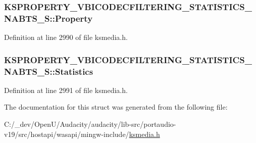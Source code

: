 \subsubsection[{\texorpdfstring{Property}{Property}}]{ K\+S\+P\+R\+O\+P\+E\+R\+T\+Y\+\_\+\+V\+B\+I\+C\+O\+D\+E\+C\+F\+I\+L\+T\+E\+R\+I\+N\+G\+\_\+\+S\+T\+A\+T\+I\+S\+T\+I\+C\+S\+\_\+\+N\+A\+B\+T\+S\+\_\+\+S\+::\+Property}\hypertarget{struct_k_s_p_r_o_p_e_r_t_y___v_b_i_c_o_d_e_c_f_i_l_t_e_r_i_n_g___s_t_a_t_i_s_t_i_c_s___n_a_b_t_s___s_a989a8766c3029dd14dda5068d6ac4077}{}\label{struct_k_s_p_r_o_p_e_r_t_y___v_b_i_c_o_d_e_c_f_i_l_t_e_r_i_n_g___s_t_a_t_i_s_t_i_c_s___n_a_b_t_s___s_a989a8766c3029dd14dda5068d6ac4077}


Definition at line 2990 of file ksmedia.\+h.

\subsubsection[{\texorpdfstring{Statistics}{Statistics}}]{ K\+S\+P\+R\+O\+P\+E\+R\+T\+Y\+\_\+\+V\+B\+I\+C\+O\+D\+E\+C\+F\+I\+L\+T\+E\+R\+I\+N\+G\+\_\+\+S\+T\+A\+T\+I\+S\+T\+I\+C\+S\+\_\+\+N\+A\+B\+T\+S\+\_\+\+S\+::\+Statistics}\hypertarget{struct_k_s_p_r_o_p_e_r_t_y___v_b_i_c_o_d_e_c_f_i_l_t_e_r_i_n_g___s_t_a_t_i_s_t_i_c_s___n_a_b_t_s___s_aa403446614d5571c6800392a460d4636}{}\label{struct_k_s_p_r_o_p_e_r_t_y___v_b_i_c_o_d_e_c_f_i_l_t_e_r_i_n_g___s_t_a_t_i_s_t_i_c_s___n_a_b_t_s___s_aa403446614d5571c6800392a460d4636}


Definition at line 2991 of file ksmedia.\+h.



The documentation for this struct was generated from the following file\+:\begin{DoxyCompactItemize}
\item 
C\+:/\+\_\+dev/\+Open\+U/\+Audacity/audacity/lib-\/src/portaudio-\/v19/src/hostapi/wasapi/mingw-\/include/\hyperlink{ksmedia_8h}{ksmedia.\+h}\end{DoxyCompactItemize}
